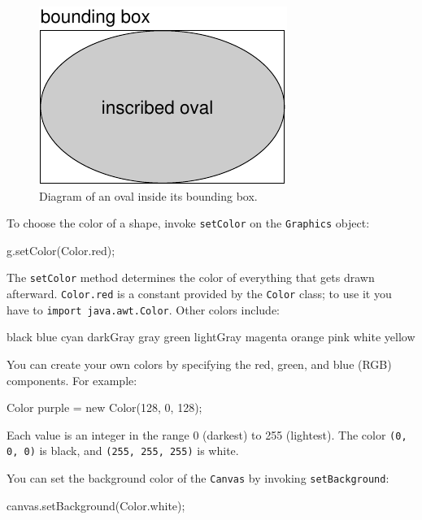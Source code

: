 \documentclass[12pt]{book}
\theoremstyle{exercise}
\newcommand{\java}[1]{\verb"#1"}
\begin{document}
\begin{figure}
\begin{center}
\includegraphics{figs/circle.pdf}
\caption{Diagram of an oval inside its bounding box.}
\label{fig.circle}
\end{center}
\end{figure}


To choose the color of a shape, invoke \java{setColor} on the \java{Graphics} object:

\begin{code}
    g.setColor(Color.red);
\end{code}

The \java{setColor} method determines the color of everything that gets drawn afterward.
\java{Color.red} is a constant provided by the {\tt Color} class; to use it you have to \java{import java.awt.Color}.
Other colors include:

\begin{stdout}
    black       blue      cyan     darkGray   gray    green
    lightGray   magenta   orange   pink       white   yellow
\end{stdout}

You can create your own colors by specifying the red, green, and blue (RGB) components.
For example:

\begin{code}
    Color purple = new Color(128, 0, 128);
\end{code}

Each value is an integer in the range 0 (darkest) to 255 (lightest).
The color \java{(0, 0, 0)} is black, and \java{(255, 255, 255)} is white.

You can set the background color of the \java{Canvas} by invoking \java{setBackground}:

\begin{code}
    canvas.setBackground(Color.white);
\end{code}
\end{document}
